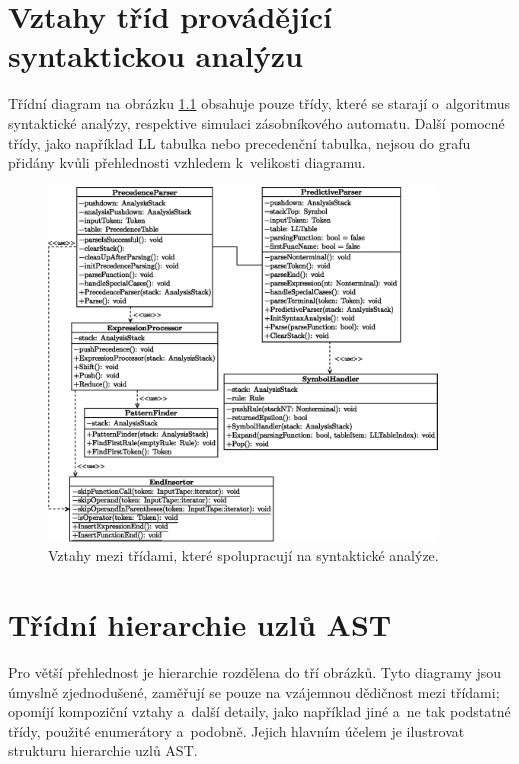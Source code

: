 \chapter{Vztahy tříd provádějící syn\-tak\-tic\-kou analýzu}\label{kap_priloha_b}

Třídní diagram na obrázku \ref{fig_parsers_class_diagram} obsahuje pouze třídy, které se starají o~algoritmus syntaktické analýzy, respektive simulaci zásobníkového automatu.
Další pomocné třídy, jako například LL tabulka nebo precedenční tabulka, nejsou do grafu přidány kvůli přehlednosti vzhledem k~velikosti diagramu.
\begin{figure}[ht]
    \centering
    \includegraphics[width=0.92\textwidth]{obrazky-figures/parsers_class_diagram.eps}
    \caption{Vztahy mezi třídami, které spolupracují na syntaktické analýze.}
    \label{fig_parsers_class_diagram}
\end{figure}

\chapter{Třídní hierarchie uzlů AST} \label{kap_priloha_c}
Pro větší přehlednost je hierarchie rozdělena do tří obrázků. Tyto diagramy jsou úmyslně zjednodušené, zaměřují se pouze na vzájemnou dědičnost mezi třídami; opomíjí kompoziční vztahy a~další detaily, jako například jiné a~ne tak podstatné třídy, použité enumerátory a~podobně. Jejich hlavním účelem je ilustrovat strukturu hierarchie uzlů AST.


